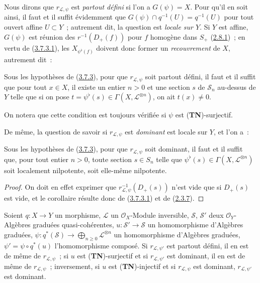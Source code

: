 Nous dirons que $r_{\mathcal{L},\psi}$ est \emph{partout défini} si l'on a
$G(\psi)=X$. Pour qu'il en soit ainsi, il faut et il suffit évidemment que
$G(\psi)\cap q^{-1}(U)=q^{-1}(U)$ pour tout ouvert affine $U\subset Y$~;
autrement dit, la question est \emph{locale sur $Y$}. Si $Y$ est affine,
$G(\psi)$ est réunion des $r^{-1}(D_+(f))$ pour $f$ homogène dans $S_+$
(\hyperref[II.2.8.1-fr]{2.8.1})~; en vertu de
(\hyperref[II.3.7.3.1-fr]{3.7.3.1}), les $X_{\psi^\flat(f)}$ doivent donc
former un \emph{recouvrement} de $X$, autrement dit~:

\begin{corollary}[3.7.4]
\label{II.3.7.4-fr}
Sous les hypothèses de (\hyperref[II.3.7.3-fr]{3.7.3}), pour que
$r_{\mathcal{L},\psi}$ soit partout défini, il faut et il suffit que pour tout
$x\in X$, il existe un entier $n>0$ et une section $s$ de $\mathcal{S}_n$
au-dessus de $Y$ telle que si on pose
$t=\psi^\flat(s)\in\Gamma(X,\mathcal{L}^{\otimes n})$, on ait $t(x)\neq0$.
\end{corollary}


On notera que cette condition est toujours vérifiée si $\psi$ est
(\textbf{TN})-surjectif.

De même, la question de savoir si $r_{\mathcal{L},\psi}$ est \emph{dominant}
est locale sur $Y$, et l'on a~:

\begin{corollary}[3.7.5]
\label{II.3.7.5-fr}
Sous les hypothèses de (\hyperref[II.3.7.3-fr]{3.7.3}), pour que
$r_{\mathcal{L},\psi}$ soit dominant, il faut et il suffit que, pour tout
entier $n>0$, toute section $s\in S_n$ telle que
$\psi^\flat(s)\in\Gamma(X,\mathcal{L}^{\otimes n})$ soit localement
nilpotente, soit elle-même nilpotente.
\end{corollary}

\begin{proof}
On doit en effet exprimer que
$r_{\mathcal{L},\psi}^{-1}(D_+(s))$ n'est vide que si $D_+(s)$ est vide,
et le corollaire résulte donc de
(\hyperref[II.3.7.3.1-fr]{3.7.3.1}) et de
(\hyperref[II.2.3.7-fr]{2.3.7}).
\end{proof}

\begin{proposition}[3.7.6]
\label{II.3.7.6-fr}
Soient $q:X\to Y$ un morphisme, $\mathcal{L}$ un $\mathcal{O}_X$-Module
inversible, $\mathcal{S}$, $\mathcal{S}'$ deux $\mathcal{O}_Y$-Algèbres
graduées quasi-cohérentes,
$u:\mathcal{S}'\to\mathcal{S}$ un homomorphisme d'Algèbres graduées,
$\psi:q^*(\mathcal{S})\to\bigoplus_{n\geq0}\mathcal{L}^{\otimes n}$ un
homomorphisme d'Algèbres graduées,
$\psi'=\psi\circ q^*(u)$ l'homomorphisme composé. Si
$r_{\mathcal{L},\psi'}$ est partout défini, il en est de même de
$r_{\mathcal{L},\psi}$~; si $u$ est (\textbf{TN})-surjectif et si
$r_{\mathcal{L},\psi'}$ est dominant, il en est de même de
$r_{\mathcal{L},\psi}$~; inversement, si $u$ est (\textbf{TN})-injectif et si
$r_{\mathcal{L},\psi}$ est dominant, $r_{\mathcal{L},\psi'}$ est dominant.
\end{proposition}

